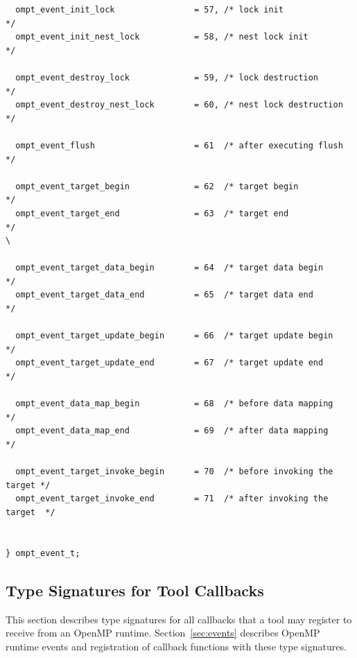 \documentclass{article}
\begin{document}
\begin{verbatim}
  ompt_event_init_lock                = 57, /* lock init                  */
  ompt_event_init_nest_lock           = 58, /* nest lock init             */
  
  ompt_event_destroy_lock             = 59, /* lock destruction           */
  ompt_event_destroy_nest_lock        = 60, /* nest lock destruction      */
			            	 			         
  ompt_event_flush                    = 61  /* after executing flush      */ 

  ompt_event_target_begin             = 62  /* target begin               */
  ompt_event_target_end               = 63  /* target end                 */                                                                                                                \

  ompt_event_target_data_begin        = 64  /* target data begin          */
  ompt_event_target_data_end          = 65  /* target data end            */

  ompt_event_target_update_begin      = 66  /* target update begin        */
  ompt_event_target_update_end        = 67  /* target update end          */

  ompt_event_data_map_begin           = 68  /* before data mapping        */
  ompt_event_data_map_end             = 69  /* after data mapping         */

  ompt_event_target_invoke_begin      = 70  /* before invoking the target */ 
  ompt_event_target_invoke_end        = 71  /* after invoking the target  */


} ompt_event_t;
\end{verbatim}

\clearpage  
\subsection{Type Signatures for Tool Callbacks}
\label{appendix:ompt-types:callbacks}
This section describes type signatures for all  callbacks that a tool may register to receive from an OpenMP runtime. Section~\ref{sec:events} describes OpenMP runtime events and registration of
callback functions with these type signatures.
\end{document}
